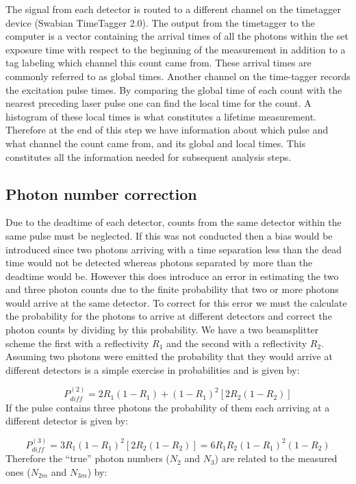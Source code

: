 \documentclass[reprint,onecolumn]{revtex4-1}
\begin{document}
The signal from each detector is routed to a different channel on
the timetagger device (Swabian TimeTagger 2.0). The output from the timetagger to the computer
is a vector containing the arrival times of all the photons within
the set exposure time with respect to the beginning of the measurement
in addition to a tag labeling which channel this count came from.
These arrival times are commonly referred to as global times. Another
channel on the time-tagger records the excitation pulse times. By
comparing the global time of each count with the nearest preceding
laser pulse one can find the local time for the count. A histogram
of these local times is what constitutes a lifetime measurement. Therefore
at the end of this step we have information about which pulse and
what channel the count came from, and its global and local times.
This constitutes all the information needed for subsequent analysis
steps.

\subsection{Photon number correction}

Due to the deadtime of each detector, counts from the same detector
within the same pulse must be neglected. If this was not conducted
then a bias would be introduced since two photons arriving with a
time separation less than the dead time would not be detected whereas
photons separated by more than the deadtime would be. However this
does introduce an error in estimating the two and three photon counts
due to the finite probability that two or more photons would
arrive at the same detector. To correct for this error we must the
calculate the probability for the photons to arrive at different detectors
and correct the photon counts by dividing by this probability. We
have a two beamsplitter scheme the first with a reflectivity $R_{1}$ and
the second with a reflectivity $R_{2}$. Assuming two photons were
emitted the probability that they would arrive at different detectors
is a simple exercise in probabilities and is given by:

\[
P_{diff}^{(2)}=2R_{1}\left(1-R_{1}\right)+\left(1-R_{1}\right)^{2}\left[2R_{2}\left(1-R_{2}\right)\right]
\]
If the pulse contains three photons the probability of them each arriving
at a different detector is given by:

\[
P_{diff}^{(3)}=3R_{1}\left(1-R_{1}\right)^{2}\left[2R_{2}\left(1-R_{2}\right)\right]=6R_{1}R_{2}\left(1-R_{1}\right)^{2}\left(1-R_{2}\right)
\]
Therefore the ``true'' photon numbers ($N_{2}$ and $N_{3}$) are
related to the measured ones ($N_{2m}$ and $N_{3m}$) by:
\end{document}
